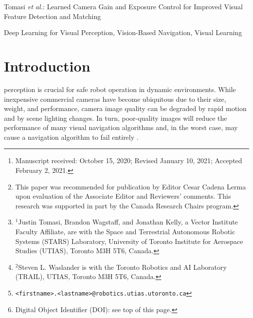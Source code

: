 \documentclass[letterpaper, 10pt, journal, twoside]{IEEEtran}
\title{\icratitle}
\author{Justin Tomasi$^{1}$, Brandon Wagstaff$^{1}$, Steven L. Waslander$^{2}$, and Jonathan Kelly$^{1}$%
\thanks{Manuscript received: October 15, 2020; Revised January 10, 2021; Accepted February 2, 2021.}%
\thanks{This paper was recommended for publication by Editor Cesar Cadena Lerma upon evaluation of the Associate Editor and Reviewers' comments. 
This research was supported in part by the Canada Research Chairs program.} %
\thanks{ $^{1}$Justin Tomasi, Brandon Wagstaff, and Jonathan Kelly, a Vector Institute Faculty Affiliate, are with the Space and Terrestrial Autonomous Robotic Systems (STARS) Laboratory, University of Toronto Institute for Aerospace Studies (UTIAS), Toronto M3H 5T6, Canada. }%
\thanks{$^{2}$Steven L. Waslander is with the Toronto Robotics and AI Laboratory (TRAIL), UTIAS, Toronto M3H 5T6, Canada.}%
\thanks{\tt{<firstname>.<lastname>@robotics.utias.utoronto.ca}}%
\thanks{Digital Object Identifier (DOI): see top of this page.}
}
\newcommand{\icratitle}{Learned Camera Gain and Exposure Control for Improved Visual Feature Detection and Matching}
\newcommand{\shorttitle}{\icratitle}
\begin{document}
{Tomasi \MakeLowercase{\textit{et al.}}: \shorttitle}
	
\maketitle

\begin{abstract}
Successful visual navigation depends upon capturing images that contain sufficient useful information.
In this paper, we explore a data-driven approach to account for environmental lighting changes, improving the quality of images for use in visual odometry (VO) or visual simultaneous localization and mapping (SLAM).
We train a deep convolutional neural network model to predictively adjust camera gain and exposure time parameters such that consecutive images contain a maximal number of matchable features. 
The training process is fully self-supervised: our training signal is derived from an underlying VO or SLAM pipeline and, as a result, the model is optimized to perform well with that specific pipeline. 
We demonstrate through extensive real-world experiments that our network can anticipate and compensate for dramatic lighting changes (e.g., transitions into and out of road tunnels), maintaining a substantially higher number of inlier feature matches than competing camera parameter control algorithms.
\end{abstract}

\begin{IEEEkeywords}
	Deep Learning for Visual Perception, Vision-Based Navigation, Visual Learning
\end{IEEEkeywords}

\section{Introduction}

 perception is crucial for safe robot operation in dynamic environments.
While inexpensive commercial cameras have become ubiquitous due to their size, weight, and performance, camera image quality can be degraded by rapid motion and by scene lighting changes. 
In turn, poor-quality images will reduce the performance of many visual navigation algorithms and, in the worst case, may cause a navigation algorithm to fail entirely \cite{Kim2017}.
\end{document}

